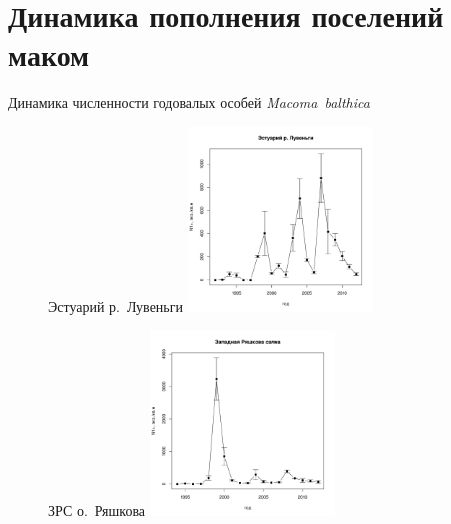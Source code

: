 \documentclass{beamer}
\begin{document}
	\section{Динамика пополнения поселений маком}
\begin{frame}{Динамика численности годовалых особей {\it Macoma~balthica}}
\begin{figure}
\begin{minipage}[b]{.49\linewidth}
	\begin{center}
\tiny{Эстуарий р.~Лувеньги}
\includegraphics[width=49mm]{../White_Sea/Estuatiy_Luvenga/Estuary_N_oneyear.pdf}
	\end{center}
	\end{minipage}
\hfil %
	\begin{minipage}[b]{.49\linewidth}
	\begin{center}
\tiny{ЗРС о.~Ряшкова}
\includegraphics[width=49mm]{../White_Sea/Ryashkov_ZRS/ZRS_N_oneyear.pdf}
	\end{center}
	\end{minipage}
\end{figure}
\end{frame}
\end{document}
